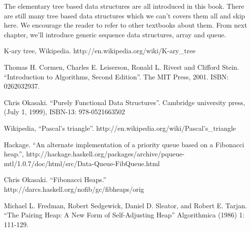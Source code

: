 \documentclass{article}
\begin{document}
The elementary tree based data structures are all introduced in this
book. There are still many tree based data structures which we can't
covers them all and skip here. We encourage the reader to refer to
other textbooks about them. From next chapter, we'll introduce generic
sequence data structures, array and queue.


\begin{thebibliography}{99}

K-ary tree, Wikipedia. http://en.wikipedia.org/wiki/K-ary\_tree

Thomas H. Cormen, Charles E. Leiserson, Ronald L. Rivest and Clifford Stein. ``Introduction to Algorithms, Second Edition''. The MIT Press, 2001. ISBN: 0262032937.

Chris Okasaki. ``Purely Functional Data Structures''. Cambridge university press, (July 1, 1999), ISBN-13: 978-0521663502

Wikipedia, ``Pascal's triangle''. http://en.wikipedia.org/wiki/Pascal's\_triangle

Hackage. ``An alternate implementation of a priority queue based on a Fibonacci heap.'', http://hackage.haskell.org/packages/archive/pqueue-mtl/1.0.7/doc/html/src/Data-Queue-FibQueue.html

Chris Okasaki. ``Fibonacci Heaps.'' http://darcs.haskell.org/nofib/gc/fibheaps/orig

Michael L. Fredman, Robert Sedgewick, Daniel D. Sleator, and Robert E. Tarjan. ``The Pairing Heap: A New Form of Self-Adjusting Heap'' Algorithmica (1986) 1: 111-129.

\end{thebibliography}

\ifx\wholebook\relax \else
\end{document}
